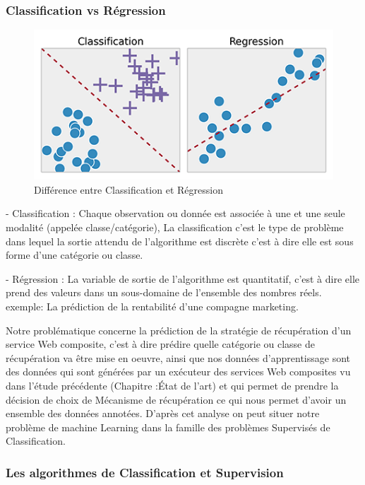 \subsubsection{Classification vs Régression }

\begin{figure}[H]
\begin{center}
\includegraphics[width=1\linewidth]{images/ClassReg.png}
\end{center}
\caption{Différence entre Classification et Régression}
\label{fig:6}
\end{figure}

- Classification : Chaque observation ou donnée  est associée à une et une seule modalité (appelée classe/catégorie), La classification c'est le type de problème dans lequel la sortie attendu de l'algorithme est discrète c'est à dire elle est sous forme d'une catégorie ou classe.
    
- Régression : La variable de sortie de l'algorithme est quantitatif, c'est à dire elle  prend des valeurs dans un sous-domaine de l’ensemble des nombres réels. exemple: La prédiction de la rentabilité d'une compagne marketing. 


Notre problématique concerne la prédiction de la stratégie de récupération d'un service Web composite, c'est à dire prédire quelle catégorie ou classe de récupération va être mise en oeuvre, ainsi que nos données d'apprentissage sont des données qui sont générées par  un exécuteur des services Web composites vu dans l'étude précédente (Chapitre :État de l'art) et  qui permet de prendre la décision de choix de Mécanisme de récupération ce qui nous permet d'avoir un ensemble des données annotées. 
D'après cet analyse on peut situer notre problème de machine Learning dans la famille des problèmes Supervisés de Classification.

\subsubsection{Les algorithmes de Classification et Supervision}



